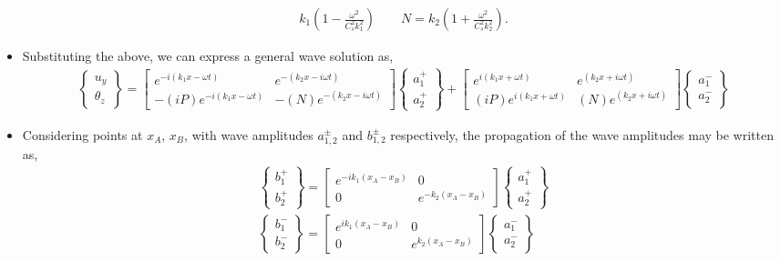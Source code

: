 \documentclass[aspectratio=169]{beamertmd}
\begin{document}
\begin{frame}[allowframebreaks]
\begin{itemize}
\begin{align*}
      k_1\left(1-\frac{\omega^2}{C_s^2k_1^2}\right) \qquad N =
      k_2\left(1+\frac{\omega^2}{C_s^2k_2^2}\right).
    \end{align*}
  \item Substituting the above, we can express a general wave solution
    as, 
    {\footnotesize
      \begin{align*}
        \begin{Bmatrix} u_y\\ \theta_z \end{Bmatrix} = \begin{bmatrix}
          e^{-i(k_1x-\omega t)} & 
          e^{-(k_2x-i\omega t)} \\
          -(iP)e^{-i(k_1x-\omega t)} & -(N)
          e^{-(k_2x-i\omega t)} \end{bmatrix} \begin{Bmatrix} a_1^+\\
          a_2^+ \end{Bmatrix} + \begin{bmatrix} e^{i(k_1x+\omega t)} & 
          e^{(k_2x+i\omega t)}\\ (iP) e^{i(k_1x+\omega t)} & (N) e^{(k_2x+i\omega
            t)} \end{bmatrix} \begin{Bmatrix} a_1^-\\
          a_2^- \end{Bmatrix}
      \end{align*}}
  \item Considering points at $x_A$, $x_B$, with wave amplitudes
    $a_{1,2}^\pm$ and $b_{1,2}^\pm$ respectively, the propagation of
    the wave amplitudes may be written as,
    \begin{align*}
      \boxed{\begin{Bmatrix} b_1^+\\ b_2^+ \end{Bmatrix}
      = \begin{bmatrix} e^{-ik_1(x_A-x_B)} & 0\\0 &
        e^{-k_2(x_A-x_B)} \end{bmatrix} \begin{Bmatrix} a_1^+\\
          a_2^+ \end{Bmatrix}}\\
      \boxed{\begin{Bmatrix} b_1^-\\ b_2^- \end{Bmatrix}
      = \begin{bmatrix} e^{ik_1(x_A-x_B)} & 0\\0 &
        e^{k_2(x_A-x_B)} \end{bmatrix} \begin{Bmatrix} a_1^-\\
        a_2^- \end{Bmatrix}}
    \end{align*}
  \end{itemize}
\end{frame}
\end{document}
